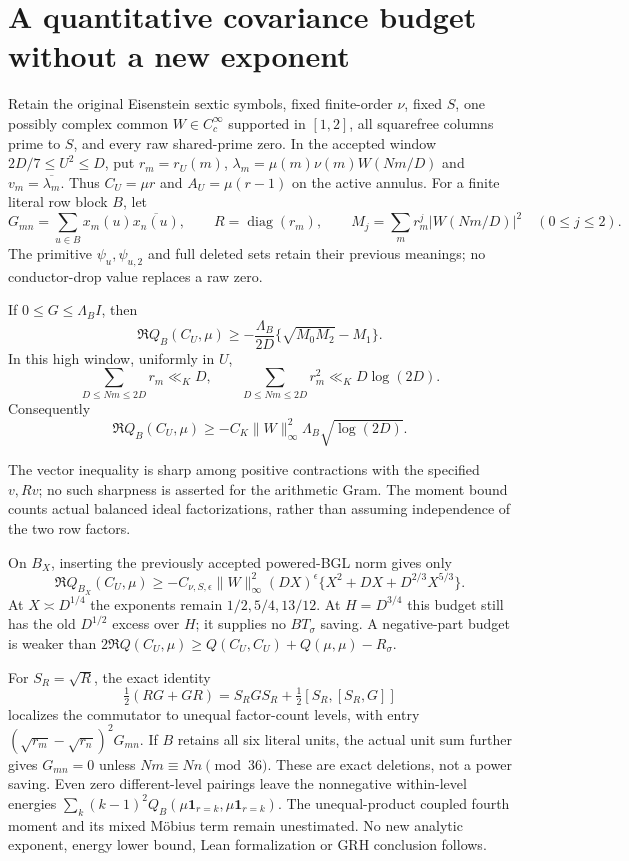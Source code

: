 \section{A quantitative covariance budget without a new exponent}\label{cbq:core}
Retain the original Eisenstein sextic symbols, fixed finite-order $\nu$,
fixed $S$, one possibly complex common $W\in C_c^\infty$ supported in
$[1,2]$, all squarefree columns prime to $S$, and every raw shared-prime
zero. In the accepted window $2D/7\le U^2\le D$, put $r_m=r_U(m)$,
$\lambda_m=\mu(m)\nu(m)W(Nm/D)$ and $v_m=\overline{\lambda_m}$.
Thus $C_U=\mu r$ and $A_U=\mu(r-1)$ on the active annulus.
For a finite literal row block $B$, let
\[
 G_{mn}=\sum_{u\in B}x_m(u)\overline{x_n(u)},\qquad
 R=\operatorname{diag}(r_m),\qquad
 M_j=\sum_mr_m^j|W(Nm/D)|^2\quad(0\le j\le2).
\]
The primitive $\psi_u,\psi_{u,2}$ and full deleted sets retain their
previous meanings; no conductor-drop value replaces a raw zero.

\begin{proposition}\label{cbq:budget}
If $0\le G\le\Lambda_B I$, then
\begin{equation}\label{cbq:vector}
 \Re Q_B(C_U,\mu)\ge
 -\frac{\Lambda_B}{2D}\{\sqrt{M_0M_2}-M_1\}.
\end{equation}
In this high window, uniformly in $U$,
\begin{equation}\label{cbq:moments}
 \sum_{D\le Nm\le2D}r_m\ll_K D,\qquad
 \sum_{D\le Nm\le2D}r_m^2\ll_K D\log(2D).
\end{equation}
Consequently
\[
 \Re Q_B(C_U,\mu)\ge
 -C_K\|W\|_\infty^2\Lambda_B\sqrt{\log(2D)}.
\]
\end{proposition}
The vector inequality is sharp among positive contractions with the
specified $v,Rv$; no such sharpness is asserted for the arithmetic Gram.
The moment bound counts actual balanced ideal factorizations, rather than
assuming independence of the two row factors.

On $B_X$, inserting the previously accepted powered-BGL norm gives only
\[
 \Re Q_{B_X}(C_U,\mu)\ge
 -C_{\nu,S,\epsilon}\|W\|_\infty^2(DX)^\epsilon
 \{X^2+DX+D^{2/3}X^{5/3}\}.
\]
At $X\asymp D^{1/4}$ the exponents remain $1/2,5/4,13/12$.
At $H=D^{3/4}$ this budget still has the old $D^{1/2}$ excess over $H$;
it supplies no $BT_\sigma$ saving. A negative-part budget is weaker than
$2\Re Q(C_U,\mu)\ge Q(C_U,C_U)+Q(\mu,\mu)-R_\sigma$.

For $S_R=\sqrt R$, the exact identity
\[
 \tfrac12(RG+GR)=S_RGS_R+\tfrac12[S_R,[S_R,G]]
\]
localizes the commutator to unequal factor-count levels, with entry
$(\sqrt{r_m}-\sqrt{r_n})^2G_{mn}$. If $B$ retains all six literal units,
the actual unit sum further gives $G_{mn}=0$ unless $Nm\equiv Nn\pmod{36}$.
These are exact deletions, not a power saving. Even zero different-level
pairings leave the nonnegative within-level energies
$\sum_k(k-1)^2Q_B(\mu\mathbf1_{r=k},\mu\mathbf1_{r=k})$.
The unequal-product coupled fourth moment and its mixed M\"obius term
remain unestimated. No new analytic exponent, energy lower bound,
Lean formalization or GRH conclusion follows.
